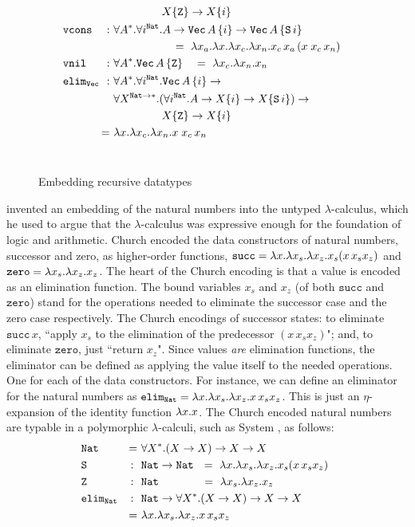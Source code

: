 \begin{figure}
\begin{align*}
&&& \qquad~\qquad X\{\texttt{Z}\} -> X\{i\} \\
 &\!\!\!\!\!\!\texttt{vcons} &\!\!\!\!\!\!\!\!:~& \forall A^{*}.\forall i^\mathtt{Nat}.A-> \mathtt{Vec}\,A\,\{i\}-> \mathtt{Vec}\,A\,\{\mathtt{S}\,i\} \\
&&&\;\qquad\qquad\quad =~ \l x_a.\l x.\l x_c.\l x_n. x_c\,x_a\,(x\;x_c\,x_n) \\
&\!\!\!\!\!\!\mathtt{vnil} &\!\!\!\!\!\!\!\!:~& \forall A^{*}.\texttt{Vec}\,A\,\{\mathtt{Z}\} 
~~~=~ \l x_c.\l x_n.x_n \\
&\!\!\!\!\!\!\mathtt{elim_{Vec}} &\!\!\!\!\!\!\!\!:~& \forall A^{*}.\forall i^\mathtt{Nat}.\texttt{Vec}\,A\,\{i\} -> \\
&&& \forall X^{\mathtt{Nat}-> *}.(\forall i^\mathtt{Nat}.A -> X\{i\} -> X\{\mathtt{S}\,i\}) -> \\
&&& \qquad~\qquad X\{\mathtt{Z}\} -> X\{i\} \\
& &\!\!\!\!\!=~& \l x.\l x_c. \l x_n.x\;x_c\,x_n
\end{align*} ~\vspace*{-14pt}
\caption{Embedding recursive datatypes}
\label{fig:churchrec}
\end{figure}
\citet{Church33} invented an embedding of the natural numbers into
the untyped $\lambda$-calculus, which he used to argue
that the $\lambda$-calculus was expressive enough for the foundation of
logic and arithmetic. Church encoded the data constructors of natural numbers,
successor and zero, as higher-order functions,
$\mathtt{succ}=\lambda x.\lambda x_s.\lambda x_z.x_s(x\,x_s x_z)$ and
$\mathtt{zero}=\lambda x_s.\lambda x_z.x_z$.
The heart of the Church encoding is that a value is encoded as an elimination function.
The bound variables $x_s$ and $x_z$ (of both $\mathtt{succ}$ and $\mathtt{zero}$) stand for the operations needed to
eliminate the successor case and the zero case respectively. The Church encodings of
successor states: to eliminate $\mathtt{succ}\,x$, ``apply $x_s$
to the elimination of the predecessor $(x\,x_s x_z)$"; and,
to eliminate $\mathtt{zero}$, just ``return $x_z$".
Since values {\it are} elimination functions, the
eliminator can be defined as applying the value itself to the needed operations. One
for each of the data constructors. 
For instance, we can define an eliminator
for the natural numbers as $\mathtt{elim_{Nat}}=\lambda x.\lambda x_s.\lambda x_z.x\,x_s x_z$.
This is just an $\eta$-expansion of the identity function $\lambda x.x$.
The Church encoded natural numbers are typable in a polymorphic $\lambda$-calculi,
such as System \Fw, as follows:\vspace*{-2pt}
\begin{align*}
&\texttt{Nat} &=~& \forall X^{*}.(X -> X) -> X -> X \qquad\qquad\qquad\\
&\texttt{S} &\!\!\!:~~& \texttt{Nat} -> \texttt{Nat}
	~~ =~ \l x.\l x_s.\l x_z.x_s(x\,x_s x_z) \\
&\texttt{Z} &\!\!\!:~~& \texttt{Nat} \qquad\quad\,
	~~ =~ \l x_s.\l x_z.x_z \\
&\mathtt{elim_{Nat}} &\!\!\!:~~& \texttt{Nat} -> \forall X^{*}.(X -> X)-> X-> X \\
& &=~& \l x.\l x_s.\l x_z.x\,x_s x_z
\end{align*}~\vspace*{-13pt}

